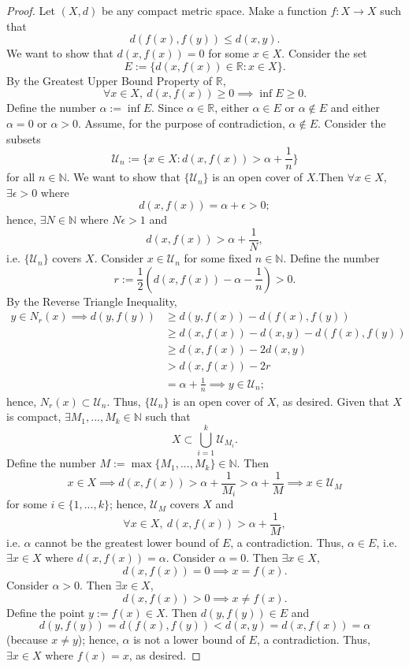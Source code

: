 \documentclass{amsart}
\theoremstyle{definition}
\begin{document}
\begin{proof}
    Let $(X,d)$ be any compact metric space. Make a function $f: X \to X$ such that
    \[
    d(f(x),f(y)) \leq d(x,y).
    \]
    We want to show that $d(x,f(x)) = 0$ for some $x \in X$. Consider the set
    \[
    E := \{d(x,f(x)) \in \mathbb{R} : x \in X\}.
    \]
    By the Greatest Upper Bound Property of $\mathbb{R}$, 
    \[
    \forall x \in X, \ d(x,f(x)) \geq 0 \implies \inf E \geq 0.
    \]
    Define the number $\alpha := \inf E$. Since $\alpha \in \mathbb{R}$, either $\alpha \in E$ or $\alpha \not \in E$ and either $\alpha = 0$ or $\alpha > 0$. Assume, for the purpose of contradiction, $\alpha \notin E$. Consider the subsets
    \[
    \mathcal{U}_{n} := \{x \in X : d(x,f(x)) > \alpha + \frac{1}{n}\}
    \]
    for all $n \in \mathbb{N}$. We want to show that $\{\mathcal{U}_n\}$ is an open cover of $X$.Then $\forall x \in X$, $\exists \epsilon > 0$ where
    \[
    d(x,f(x)) = \alpha + \epsilon > 0;
    \]    
    hence, $\exists N \in \mathbb{N}$ where $N\epsilon > 1$ and 
    \[
    d(x,f(x)) > \alpha + \frac{1}{N}, 
    \]
    i.e. $\{\mathcal{U}_n\}$ covers $X$. Consider $x \in \mathcal{U}_{n}$ for some fixed $n \in \mathbb{N}$. Define the number
    \[
     r := \frac{1}{2}\left(d(x,f(x)) - \alpha - \frac{1}{n}\right) > 0.
    \]
    By the Reverse Triangle Inequality, 
    \begin{align*}
        y \in N_r(x) \implies d(y,f(y)) &\geq d(y,f(x)) - d(f(x),f(y)) \\
        &\geq d(x,f(x)) - d(x,y) - d(f(x),f(y))\\
        &\geq d(x,f(x)) - 2d(x,y) \\
        &> d(x,f(x)) - 2r \\
        &= \alpha + \frac{1}{n} \implies y \in \mathcal{U}_n;
    \end{align*}
    hence, $N_r(x) \subset \mathcal{U}_n$. Thus, $\{\mathcal{U}_n\}$ is an open cover of $X$, as desired. Given that $X$ is compact, $\exists M_1,...,M_k \in \mathbb{N}$ such that 
    \[
    X \subset \bigcup_{i = 1}^{k}\mathcal{U}_{M_i}.
    \]
    Define the number $M := \max\{M_1,...,M_k\} \in \mathbb{N}$. Then
    \[
    x \in X \implies d(x,f(x)) > \alpha + \frac{1}{M_i} > \alpha + \frac{1}{M} \implies x \in \mathcal{U}_M
    \]
    for some $i \in \{1,...,k\}$; hence, $\mathcal{U}_{M}$ covers $X$ and
    \[
    \forall x \in X, \ d(x,f(x)) > \alpha + \frac{1}{M},
    \]
    i.e. $\alpha$ cannot be the greatest lower bound of $E$, a contradiction. Thus, $\alpha \in E$, i.e. $\exists x \in X$ where $d(x,f(x)) = \alpha$. Consider $\alpha = 0$. Then $\exists x \in X$,
    \[
    d(x,f(x)) = 0 \implies x = f(x).
    \]
    Consider $\alpha > 0$. Then $\exists x \in X$,
    \[
    d(x,f(x)) > 0 \implies x \neq f(x).
    \] 
    Define the point $y := f(x) \in X$. Then $d(y,f(y)) \in E$ and 
    \[
    d(y,f(y)) = d(f(x),f(y)) < d(x,y) = d(x,f(x)) = \alpha 
    \]
    (because $x \neq y$); hence, $\alpha$ is not a lower bound of $E$, a contradiction. Thus, $\exists x \in X$ where $f(x) = x$, as desired.
\end{proof}
\end{document}
